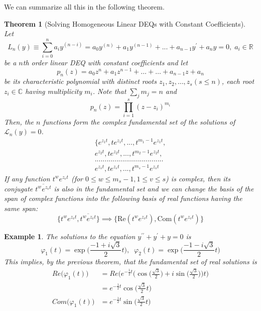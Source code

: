 \documentclass{article}
\newtheorem{theorem}{Theorem}[section]
\newtheorem{example}{Example}[section]
\theoremstyle{remark}
\theoremstyle{definition}
\begin{document}
We can summarize all this in the following theorem. 

\begin{theorem}[Solving Homogeneous Linear DEQs with Constant Coefficients]
Let
\[L_n (y) \equiv \sum_{i=0}^n a_i y^{(n-i)} = a_0 y^{(n)} + a_1 y^{(n-1)} + ... + a_{n-1} y^\prime + a_n y = 0, \; a_i \in \mathbb{R} \]
be a $n$th order linear DEQ with constant coefficients and let
\[p_n (z) = a_0 z^n + a_1 z^{n-1} + \ldots + \ldots + a_{n-1} z + a_n\]
be its characteristic polynomial with distinct roots $z_1, z_2, \ldots, z_s (s \leq n)$, each root $z_i \in \mathbb{C}$ having multiplicity $m_i$. Note that $\sum_j m_j = n$ and 
\[p_n (z) = \prod_{i=1}^s (z - z_i)^{m_i}\]
Then, the $n$ functions form the complex fundamental set of the solutions of $\mathcal{L}_n (y) = 0$. 
\begin{align*}
    \{ e^{z_1 t}, t e^{z_1 t}, ..., t^{m_1 - 1} e^{z_1 t},  \\
    e^{z_2 t}, t e^{z_2 t}, ..., t^{m_2 - 1} e^{z_2 t}, \\
    ................................... \\
    e^{z_s t}, t e^{z_s t}, ..., t^{m_s - 1} e^{z_s t}
\end{align*}
If any function $t^w e^{z_v t}$ (for $0 \leq w \leq m_s - 1, 1 \leq v \leq s$) is complex, then its conjugate $\overline{t^w e^{z_v t}}$ is also in the fundamental set and we can change the basis of the span of complex functions into the following basis of real functions having the same span:
\[\{t^w e^{z_v t}, \overline{t^w e^{z_v t}}\} \implies \{\text{Re}(t^w e^{z_v t}), \text{Com}(t^w e^{z_v t})\}\]
\end{theorem}

\begin{example}
The solutions to the equation $y^{\prime \prime} + y^\prime + y = 0$ is 
\[\varphi_1 (t) = \exp \Big(\frac{-1+i\sqrt{3}}{2} t \Big), \;\; \varphi_2 (t) = \exp \Big( \frac{-1 - i \sqrt{3}}{2} t\Big) \]
This implies, by the previous theorem, that the fundamental set of real solutions is
\begin{align*}
    Re \big(\varphi_1 (t)\big) & = Re \bigg( e^{-\frac{1}{2} t} \Big( \cos{\Big(\frac{\sqrt{3}}{2}\Big)} + i \sin{\Big(\frac{\sqrt{3}}{2}\Big)}\Big) t\bigg) \\
    & = e^{-\frac{1}{2} t} \cos{\Big(\frac{\sqrt{3}}{2} t\Big)}  \\
    Com \big(\varphi_1 (t)\big) & = e^{-\frac{1}{2} t} \sin{\Big(\frac{\sqrt{3}}{2} t\Big)} 
\end{align*}
\end{example}
\end{document}
